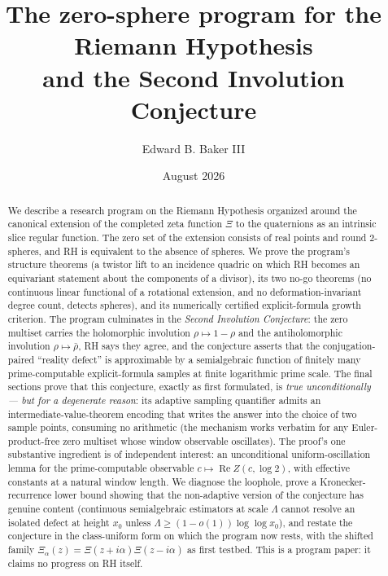 \documentclass[11pt]{amsart}
\theoremstyle{plain}
\theoremstyle{definition}
\theoremstyle{remark}
\newcommand{\re}{\operatorname{Re}}
\begin{document}
\title[The zero-sphere program and the Second Involution Conjecture]{The zero-sphere program for the Riemann Hypothesis\\ and the Second Involution Conjecture}

\author{Edward B. Baker III}

\date{August 2026}

\begin{abstract}
We describe a research program on the Riemann Hypothesis organized around the
canonical extension of the completed zeta function $\Xi$ to the quaternions as an intrinsic slice
regular function. The zero set of the extension consists of real points and round $2$-spheres, and RH
is equivalent to the absence of spheres. We prove the program's structure theorems (a twistor lift to
an incidence quadric on which RH becomes an equivariant statement about the components of a divisor),
its two no-go theorems (no continuous linear functional of a rotational extension, and no
deformation-invariant degree count, detects spheres), and its numerically certified explicit-formula
growth criterion. The program culminates in the \emph{Second Involution Conjecture}: the
zero multiset carries the holomorphic involution $\rho\mapsto1-\rho$ and the antiholomorphic
involution $\rho\mapsto\bar\rho$, RH says they agree, and the conjecture asserts that the
conjugation-paired ``reality defect'' is approximable by a semialgebraic function of finitely many
prime-computable explicit-formula samples at finite logarithmic prime scale. The final sections prove
that this conjecture, exactly as first formulated, is \emph{true unconditionally --- but for a
degenerate reason}: its adaptive sampling quantifier admits an intermediate-value-theorem encoding
that writes the answer into the choice of two sample points, consuming no arithmetic (the mechanism
works verbatim for any Euler-product-free zero multiset whose window observable oscillates). The
proof's one substantive ingredient is of independent interest: an unconditional
uniform-oscillation lemma for the prime-computable observable $c\mapsto\re Z(c,\log2)$, with
effective constants at a natural window length. We diagnose the loophole, prove a
Kronecker-recurrence lower bound showing that the non-adaptive version of the conjecture has genuine
content (continuous semialgebraic estimators at scale $\Lambda$ cannot resolve an isolated defect at
height $x_0$ unless $\Lambda\ge(1-o(1))\log\log x_0$), and restate the conjecture in the
class-uniform form on which the program now rests, with the shifted family
$\Xi_\alpha(z)=\Xi(z+i\alpha)\Xi(z-i\alpha)$ as first testbed. This is a program paper: it claims no
progress on RH itself.
\end{abstract}
\end{document}
